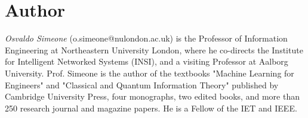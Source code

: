 \documentclass[journal]{IEEEtran}
\theoremstyle{definition}
\theoremstyle{remark}
\begin{document}
\section*{Author}
\emph{Osvaldo Simeone} (o.simeone@nulondon.ac.uk) is the Professor of Information Engineering at Northeastern University London, where he co-directs the Institute for  Intelligent Networked Systems (INSI), and a visiting Professor at Aalborg University. Prof. Simeone is the author of the textbooks "Machine Learning for Engineers" and "Classical and Quantum Information Theory" published by Cambridge University Press, four monographs, two edited books, and more than 250 research journal and magazine papers. He is a Fellow of the IET and IEEE.  





\end{document}
